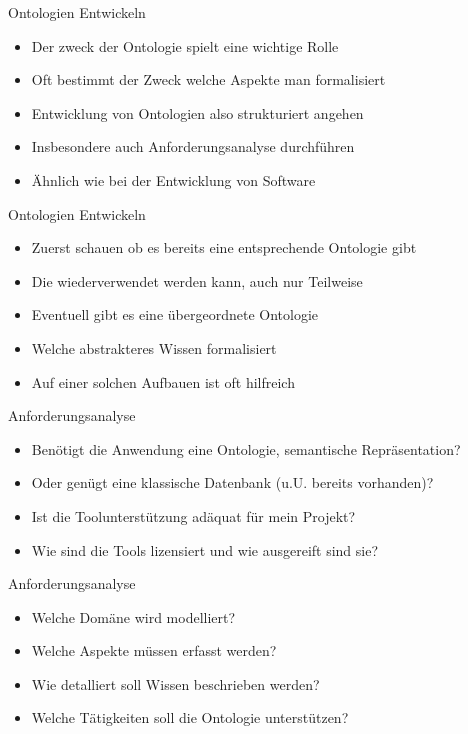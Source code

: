 \documentclass{beamer}
\begin{document}
\begin{frame}{Ontologien Entwickeln}
	
	\begin{itemize}
		\item Der zweck der Ontologie spielt eine wichtige Rolle
		\item Oft bestimmt der Zweck welche Aspekte man formalisiert
		\item Entwicklung von Ontologien also strukturiert angehen
		\item Insbesondere auch Anforderungsanalyse durchführen
		\item Ähnlich wie bei der Entwicklung von Software
	\end{itemize}
	
\end{frame}

\begin{frame}{Ontologien Entwickeln}
	
	\begin{itemize}
		\item Zuerst schauen ob es bereits eine entsprechende \textit{}Ontologie gibt
		\item Die wiederverwendet werden kann, auch nur Teilweise
		\item Eventuell gibt es eine übergeordnete Ontologie
		\item Welche abstrakteres Wissen formalisiert
		\item Auf einer solchen Aufbauen ist oft hilfreich
	\end{itemize}
	
\end{frame}

\begin{frame}{Anforderungsanalyse}
	
	\begin{itemize}
		\item Benötigt die Anwendung eine Ontologie, semantische Repräsentation?
		\item Oder genügt eine klassische Datenbank (u.U. bereits vorhanden)?
		\item Ist die Toolunterstützung adäquat für mein Projekt?
		\item Wie sind die Tools lizensiert und wie ausgereift sind sie?
	\end{itemize}
	
\end{frame}

\begin{frame}{Anforderungsanalyse}
	
	\begin{itemize}
		\item Welche Domäne wird modelliert?
		\item Welche Aspekte müssen erfasst werden?
		\item Wie detalliert soll Wissen beschrieben werden?
		\item Welche Tätigkeiten soll die Ontologie unterstützen?
	\end{itemize}
	
\end{frame}
\end{document}

